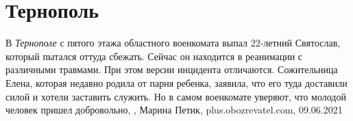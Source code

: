  
 
 
 
 
\chapter{Тернополь}

В \emph{Тернополе} с пятого этажа областного военкомата выпал 22-летний
Святослав, который пытался оттуда сбежать. Сейчас он находится в реанимации с
различными травмами. При этом версии инцидента отличаются. Сожительница Елена,
которая недавно родила от парня ребенка, заявила, что его туда доставили силой
и хотели заставить служить. Но в самом военкомате уверяют, что молодой человек
пришел добровольно,
, Марина Петик, plus.obozrevatel.com, 09.06.2021


